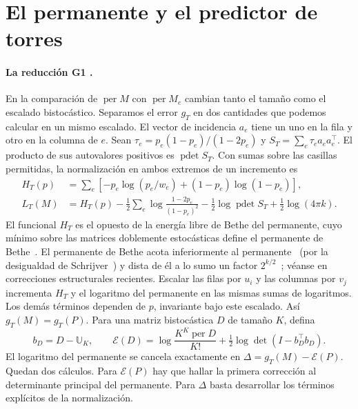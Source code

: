 \section{El permanente y el predictor de torres}\label{app:torres}
\label{app:rook}
\paragraph{La reducción G1 .}
En la comparación de $\operatorname{per}M$ con $\operatorname{per}M_e$ cambian tanto el tamaño
como el escalado bistocástico. Separamos el error $g_T$ en dos cantidades que podemos calcular
en un mismo escalado. El vector de incidencia $a_e$ tiene un uno en la fila y otro en la columna
de $e$.
Sean $\tau_e=p_e(1-p_e)/(1-2p_e)$ y $S_T=\sum_e\tau_e a_ea_e^\top$.
El producto de sus autovalores positivos es $\operatorname{pdet}S_T$.
Con sumas sobre las casillas permitidas, la normalización en ambos extremos de un incremento es
\[
\begin{aligned}
 H_T(p)&=\sum_e[-p_e\log(p_e/w_e)+(1-p_e)\log(1-p_e)],\\
 L_T(M)&=H_T(p)-\tfrac12\sum_e\log\frac{1-2p_e}{(1-p_e)^2}
         -\tfrac12\log\operatorname{pdet} S_T+\tfrac12\log(4\pi k).
\end{aligned}
\]
El funcional $H_T$ es el opuesto de la energía libre de Bethe del permanente, cuyo mínimo sobre las
matrices doblemente estocásticas define el permanente de Bethe~\cite{vontobel,cy}. El permanente de
Bethe acota inferiormente al permanente~\cite{gurvits} (por la desigualdad de
Schrijver~\cite{schrijver}) y dista de él a lo sumo un factor $2^{k/2}$~\cite{ar}; véanse
en~\cite{np} correcciones estructurales recientes.
Escalar las filas por $u_i$ y las columnas por $v_j$ incrementa $H_T$ y el logaritmo del
permanente en las mismas sumas de logaritmos. Los demás términos dependen de $p$, invariante
bajo este escalado. Así $g_T(M)=g_T(P)$. Para una matriz bistocástica $D$ de tamaño $K$, defina
\[
 b_D=D-\mathbb U_K,\qquad
 \mathcal E(D)=\log\frac{K^K\operatorname{per}D}{K!}
             +\tfrac12\log\det(I-b_D^\top b_D).
\]
El logaritmo del permanente se cancela exactamente en $\Delta=g_T(M)-\mathcal E(P)$. Quedan dos
cálculos. Para $\mathcal E(P)$ hay que hallar la primera corrección al determinante principal
del permanente. Para $\Delta$ basta desarrollar los términos explícitos de la normalización.

